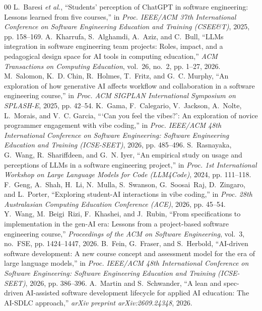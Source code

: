 \documentclass[conference]{IEEEtran}
\begin{document}
\begin{thebibliography}{00}
 L.~Baresi \emph{et al.}, ``Students' perception of ChatGPT in software engineering: Lessons learned from five courses,'' in \emph{Proc. IEEE/ACM 37th International Conference on Software Engineering Education and Training (CSEE\&T)}, 2025, pp. 158--169.
 A.~Kharrufa, S.~Alghamdi, A.~Aziz, and C.~Bull, ``LLMs integration in software engineering team projects: Roles, impact, and a pedagogical design space for AI tools in computing education,'' \emph{ACM Transactions on Computing Education}, vol.~26, no.~2, pp. 1--27, 2026.
 M.~Salomon, K.~D. Chin, R.~Holmes, T.~Fritz, and G.~C. Murphy, ``An exploration of how generative AI affects workflow and collaboration in a software engineering course,'' in \emph{Proc. ACM SIGPLAN International Symposium on SPLASH-E}, 2025, pp. 42--54.
 K.~Gama, F.~Calegario, V.~Jackson, A.~Nolte, L.~Morais, and V.~C. Garcia, ```Can you feel the vibes?': An exploration of novice programmer engagement with vibe coding,'' in \emph{Proc. IEEE/ACM 48th International Conference on Software Engineering: Software Engineering Education and Training (ICSE-SEET)}, 2026, pp. 485--496.
 S.~Rasnayaka, G.~Wang, R.~Shariffdeen, and G.~N. Iyer, ``An empirical study on usage and perceptions of LLMs in a software engineering project,'' in \emph{Proc. 1st International Workshop on Large Language Models for Code (LLM4Code)}, 2024, pp. 111--118.
 F.~Geng, A.~Shah, H.~Li, N.~Mulla, S.~Swanson, G.~Soosai~Raj, D.~Zingaro, and L.~Porter, ``Exploring student-AI interactions in vibe coding,'' in \emph{Proc. 28th Australasian Computing Education Conference (ACE)}, 2026, pp. 45--54.
 Y.~Wang, M.~Beigi~Rizi, F.~Khashei, and J.~Rubin, ``From specifications to implementation in the gen-AI era: Lessons from a project-based software engineering course,'' \emph{Proceedings of the ACM on Software Engineering}, vol.~3, no.~FSE, pp. 1424--1447, 2026.
 B.~Fein, G.~Fraser, and S.~Herbold, ``AI-driven software development: A new course concept and assessment model for the era of large language models,'' in \emph{Proc. IEEE/ACM 48th International Conference on Software Engineering: Software Engineering Education and Training (ICSE-SEET)}, 2026, pp. 386--396.
 A.~Martin and S.~Schwander, ``A lean and spec-driven AI-assisted software development lifecycle for applied AI education: The AI-SDLC approach,'' \emph{arXiv preprint arXiv:2609.24348}, 2026.

\end{thebibliography}
\end{document}
